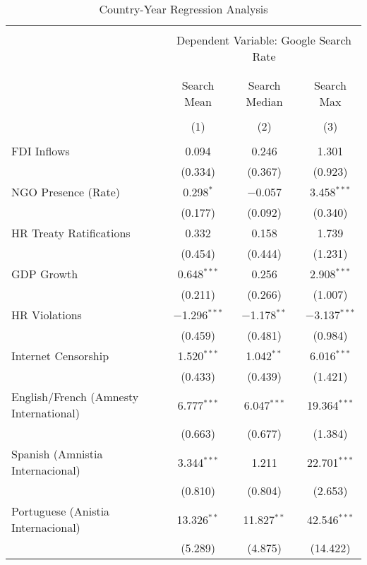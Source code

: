 
\begin{table}[!htbp] \centering 
  \caption{Country-Year Regression Analysis} 
  \label{} 
\begin{tabular}{@{\extracolsep{5pt}}lccc} 
\\[-1.8ex]\hline 
\hline \\[-1.8ex] 
 & \multicolumn{3}{c}{Dependent Variable: Google Search Rate} \\ 
\cline{2-4} 
\\[-1.8ex] & \multicolumn{3}{c}{ } \\ 
 & Search Mean & Search Median & Search Max \\ 
\\[-1.8ex] & (1) & (2) & (3)\\ 
\hline \\[-1.8ex] 
 FDI Inflows & 0.094 & 0.246 & 1.301 \\ 
  & (0.334) & (0.367) & (0.923) \\ 
  NGO Presence (Rate) & 0.298$^{*}$ & $-$0.057 & 3.458$^{***}$ \\ 
  & (0.177) & (0.092) & (0.340) \\ 
  HR Treaty Ratifications & 0.332 & 0.158 & 1.739 \\ 
  & (0.454) & (0.444) & (1.231) \\ 
  GDP Growth & 0.648$^{***}$ & 0.256 & 2.908$^{***}$ \\ 
  & (0.211) & (0.266) & (1.007) \\ 
  HR Violations & $-$1.296$^{***}$ & $-$1.178$^{**}$ & $-$3.137$^{***}$ \\ 
  & (0.459) & (0.481) & (0.984) \\ 
  Internet Censorship & 1.520$^{***}$ & 1.042$^{**}$ & 6.016$^{***}$ \\ 
  & (0.433) & (0.439) & (1.421) \\ 
  English/French (Amnesty International) & 6.777$^{***}$ & 6.047$^{***}$ & 19.364$^{***}$ \\ 
  & (0.663) & (0.677) & (1.384) \\ 
  Spanish (Amnistia Internacional) & 3.344$^{***}$ & 1.211 & 22.701$^{***}$ \\ 
  & (0.810) & (0.804) & (2.653) \\ 
  Portuguese (Anistia Internacional) & 13.326$^{**}$ & 11.827$^{**}$ & 42.546$^{***}$ \\ 
  & (5.289) & (4.875) & (14.422) \\ 

\end{tabular}
\end{table}
